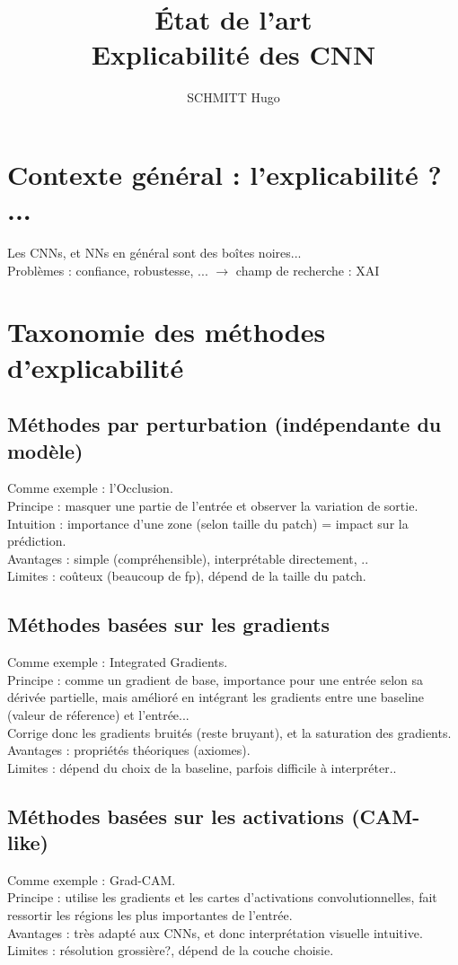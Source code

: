 \documentclass[12pt,a4paper]{article}
\title{\bfseries État de l'art \\ Explicabilité des CNN}
\author{SCHMITT Hugo}
\begin{document}
\maketitle

\section*{Contexte général : l'explicabilité ? ...}
Les CNNs, et NNs en général sont des boîtes noires...\\
Problèmes : confiance, robustesse, ... $\to$ champ de recherche : XAI


\section*{Taxonomie des méthodes d'explicabilité}

\subsection*{Méthodes par perturbation (indépendante du modèle)}
Comme exemple : l'Occlusion.\\
Principe : masquer une partie de l'entrée et observer la variation de sortie.\\
Intuition : importance d'une zone (selon taille du patch) = impact sur la prédiction.\\
Avantages : simple (compréhensible), interprétable directement, ..\\
Limites : coûteux (beaucoup de fp), dépend de la taille du patch.

\subsection*{Méthodes basées sur les gradients}
Comme exemple : Integrated Gradients.\\
Principe : comme un gradient de base, importance pour une entrée selon sa dérivée partielle, mais amélioré en intégrant les gradients entre une baseline (valeur de réference) et l'entrée...\\
Corrige donc les gradients bruités (reste bruyant), et la saturation des gradients.\\
Avantages : propriétés théoriques (axiomes).\\
Limites : dépend du choix de la baseline, parfois difficile à interpréter..

\subsection*{Méthodes basées sur les activations (CAM-like)}
Comme exemple : Grad-CAM.\\
Principe : utilise les gradients et les cartes d'activations convolutionnelles, fait ressortir les régions les plus importantes de l'entrée.\\
Avantages : très adapté aux CNNs, et donc interprétation visuelle intuitive.\\
Limites : résolution grossière?, dépend de la couche choisie.
\end{document}
